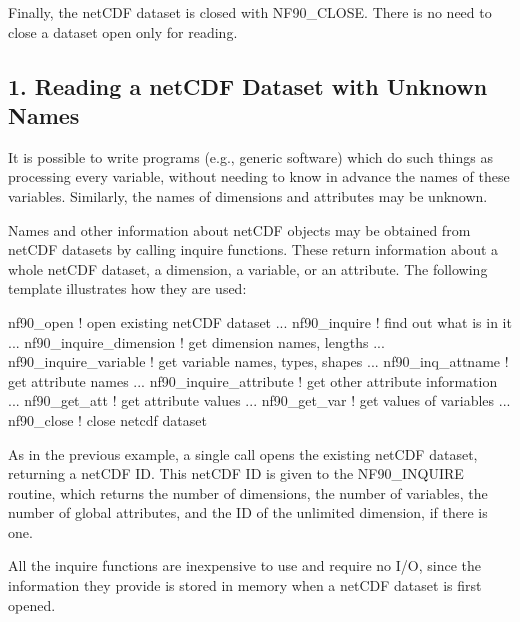 Finally, the net\+C\+DF dataset is closed with N\+F90\+\_\+\+C\+L\+O\+SE. There is no need to close a dataset open only for reading.\hypertarget{f90-use-of-the-netcdf-library_f90-reading-a-netcdf-dataset-with-unknown-names}{}\subsection{1. Reading a net\+C\+D\+F Dataset with Unknown Names }\label{f90-use-of-the-netcdf-library_f90-reading-a-netcdf-dataset-with-unknown-names}
It is possible to write programs (e.\+g., generic software) which do such things as processing every variable, without needing to know in advance the names of these variables. Similarly, the names of dimensions and attributes may be unknown.

Names and other information about net\+C\+DF objects may be obtained from net\+C\+DF datasets by calling inquire functions. These return information about a whole net\+C\+DF dataset, a dimension, a variable, or an attribute. The following template illustrates how they are used\+:


\begin{DoxyCode}
nf90\_open                 \textcolor{comment}{! open existing netCDF dataset}
  ...
nf90\_inquire              \textcolor{comment}{! find out what is in it}
     ...
   nf90\_inquire\_dimension \textcolor{comment}{! get dimension names, lengths}
     ...
   nf90\_inquire\_variable  \textcolor{comment}{! get variable names, types, shapes}
        ...
      nf90\_inq\_attname    \textcolor{comment}{! get attribute names}
        ...
      nf90\_inquire\_attribute \textcolor{comment}{! get other attribute information}
        ...
      nf90\_get\_att        \textcolor{comment}{! get attribute values}
        ...
   nf90\_get\_var           \textcolor{comment}{! get values of variables}
     ...
nf90\_close                ! \textcolor{keyword}{close} netcdf dataset
\end{DoxyCode}


As in the previous example, a single call opens the existing net\+C\+DF dataset, returning a net\+C\+DF ID. This net\+C\+DF ID is given to the N\+F90\+\_\+\+I\+N\+Q\+U\+I\+RE routine, which returns the number of dimensions, the number of variables, the number of global attributes, and the ID of the unlimited dimension, if there is one.

All the inquire functions are inexpensive to use and require no I/O, since the information they provide is stored in memory when a net\+C\+DF dataset is first opened.

